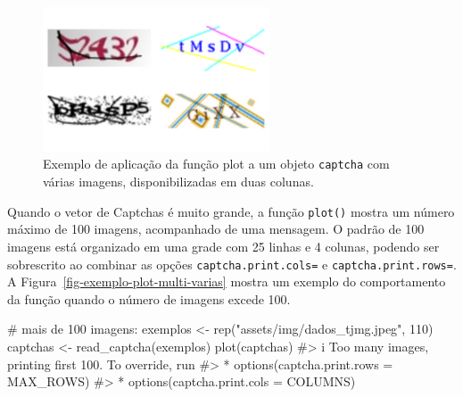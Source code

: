 \documentclass[12pt,twoside,brazilian]{book}
\newenvironment{Shaded}{\begin{snugshade}}{\end{snugshade}}
\newcommand{\CommentTok}[1]{\textcolor[rgb]{0.37,0.37,0.37}{#1}}
\newcommand{\DecValTok}[1]{\textcolor[rgb]{0.68,0.00,0.00}{#1}}
\newcommand{\FunctionTok}[1]{\textcolor[rgb]{0.28,0.35,0.67}{#1}}
\newcommand{\NormalTok}[1]{\textcolor[rgb]{0.00,0.23,0.31}{#1}}
\newcommand{\OtherTok}[1]{\textcolor[rgb]{0.00,0.23,0.31}{#1}}
\newcommand{\StringTok}[1]{\textcolor[rgb]{0.13,0.47,0.30}{#1}}
\begin{document}
\begin{figure}[H]

{\centering \includegraphics[width=0.6\textwidth,height=\textheight]{./resultados_files/figure-pdf/fig-exemplo-plot-multi-2col-1.pdf}

}

\caption{\label{fig-exemplo-plot-multi-2col}Exemplo de aplicação da
função plot a um objeto \texttt{captcha} com várias imagens,
disponibilizadas em duas colunas.}

\end{figure}

Quando o vetor de Captchas é muito grande, a função \texttt{plot()}
mostra um número máximo de 100 imagens, acompanhado de uma mensagem. O
padrão de 100 imagens está organizado em uma grade com 25 linhas e 4
colunas, podendo ser sobrescrito ao combinar as opções
\texttt{captcha.print.cols=} e \texttt{captcha.print.rows=}. A
Figura~\ref{fig-exemplo-plot-multi-varias} mostra um exemplo do
comportamento da função quando o número de imagens excede 100.

\begin{Shaded}
\begin{Highlighting}[]
\CommentTok{\# mais de 100 imagens:}
\NormalTok{exemplos }\OtherTok{\textless{}{-}} \FunctionTok{rep}\NormalTok{(}\StringTok{"assets/img/dados\_tjmg.jpeg"}\NormalTok{, }\DecValTok{110}\NormalTok{)}
\NormalTok{captchas }\OtherTok{\textless{}{-}} \FunctionTok{read\_captcha}\NormalTok{(exemplos)}
\FunctionTok{plot}\NormalTok{(captchas)}
\CommentTok{\#\textgreater{} i Too many images, printing first 100. To override, run}
\CommentTok{\#\textgreater{} * options(\textquotesingle{}captcha.print.rows\textquotesingle{} = MAX\_ROWS)}
\CommentTok{\#\textgreater{} * options(\textquotesingle{}captcha.print.cols\textquotesingle{} = COLUMNS)}
\end{Highlighting}
\end{Shaded}
\end{document}
